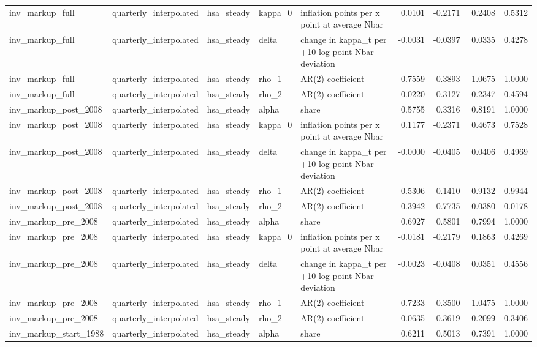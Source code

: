 \begin{tabular}{lllllrrrr}
inv\_markup\_full & quarterly\_interpolated & hsa\_steady & kappa\_0 & inflation points per x point at average Nbar & 0.0101 & -0.2171 & 0.2408 & 0.5312 \\
inv\_markup\_full & quarterly\_interpolated & hsa\_steady & delta & change in kappa\_t per +10 log-point Nbar deviation & -0.0031 & -0.0397 & 0.0335 & 0.4278 \\
inv\_markup\_full & quarterly\_interpolated & hsa\_steady & rho\_1 & AR(2) coefficient & 0.7559 & 0.3893 & 1.0675 & 1.0000 \\
inv\_markup\_full & quarterly\_interpolated & hsa\_steady & rho\_2 & AR(2) coefficient & -0.0220 & -0.3127 & 0.2347 & 0.4594 \\
inv\_markup\_post\_2008 & quarterly\_interpolated & hsa\_steady & alpha & share & 0.5755 & 0.3316 & 0.8191 & 1.0000 \\
inv\_markup\_post\_2008 & quarterly\_interpolated & hsa\_steady & kappa\_0 & inflation points per x point at average Nbar & 0.1177 & -0.2371 & 0.4673 & 0.7528 \\
inv\_markup\_post\_2008 & quarterly\_interpolated & hsa\_steady & delta & change in kappa\_t per +10 log-point Nbar deviation & -0.0000 & -0.0405 & 0.0406 & 0.4969 \\
inv\_markup\_post\_2008 & quarterly\_interpolated & hsa\_steady & rho\_1 & AR(2) coefficient & 0.5306 & 0.1410 & 0.9132 & 0.9944 \\
inv\_markup\_post\_2008 & quarterly\_interpolated & hsa\_steady & rho\_2 & AR(2) coefficient & -0.3942 & -0.7735 & -0.0380 & 0.0178 \\
inv\_markup\_pre\_2008 & quarterly\_interpolated & hsa\_steady & alpha & share & 0.6927 & 0.5801 & 0.7994 & 1.0000 \\
inv\_markup\_pre\_2008 & quarterly\_interpolated & hsa\_steady & kappa\_0 & inflation points per x point at average Nbar & -0.0181 & -0.2179 & 0.1863 & 0.4269 \\
inv\_markup\_pre\_2008 & quarterly\_interpolated & hsa\_steady & delta & change in kappa\_t per +10 log-point Nbar deviation & -0.0023 & -0.0408 & 0.0351 & 0.4556 \\
inv\_markup\_pre\_2008 & quarterly\_interpolated & hsa\_steady & rho\_1 & AR(2) coefficient & 0.7233 & 0.3500 & 1.0475 & 1.0000 \\
inv\_markup\_pre\_2008 & quarterly\_interpolated & hsa\_steady & rho\_2 & AR(2) coefficient & -0.0635 & -0.3619 & 0.2099 & 0.3406 \\
inv\_markup\_start\_1988 & quarterly\_interpolated & hsa\_steady & alpha & share & 0.6211 & 0.5013 & 0.7391 & 1.0000 \\

\end{tabular}
